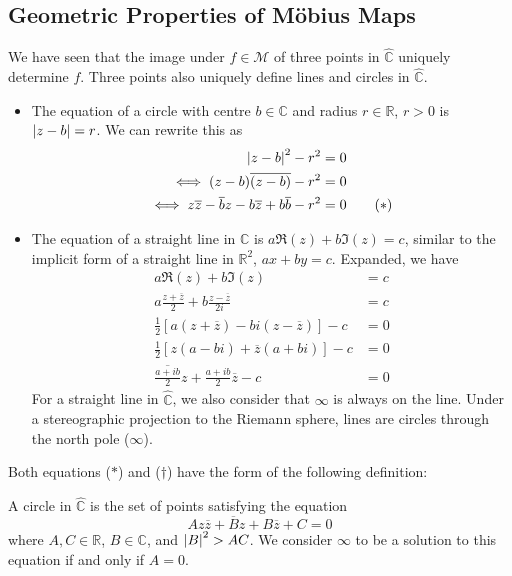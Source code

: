 \subsection{Geometric Properties of M\"obius Maps}
We have seen that the image under \(f \in \mathcal M\) of three points in \(\hat{\mathbb C}\) uniquely determine \(f\).
Three points also uniquely define lines and circles in \(\hat{\mathbb C}\).
\begin{itemize}
	\item The equation of a circle with centre \(b \in \mathbb C\) and radius \(r \in \mathbb R\), \(r > 0\) is \(\abs{z-b} = r\).
	      We can rewrite this as
	      \begin{align*}
		      \abs{z-b}^2 - r^2                                                        & = 0                \\
		      \iff (z-b)\overline{(z-b)} - r^2                                         & = 0                \\
		      \iff z\overline{z} - \overline{b}z - b\overline{z} + b\overline{b} - r^2 & = 0 \tag{\(\ast\)}
	      \end{align*}
	\item The equation of a straight line in \(\mathbb C\) is \(a \Re(z) + b \Im(z) = c\), similar to the implicit form of a straight line in \(\mathbb R^2\), \(ax+by=c\).
	      Expanded, we have
	      \begin{align*}
		      a \Re(z) + b \Im(z)                                                      & = c                   \\
		      a \frac{z + \overline z}{2} + b \frac{z - \overline z}{2i}               & = c                   \\
		      \frac{1}{2}\left[ a (z + \overline z) - bi (z - \overline z) \right] - c & = 0                   \\
		      \frac{1}{2}\left[ z(a-bi) + \overline z(a+bi) \right] - c                & = 0                   \\
		      \overline{\frac{a + ib}{2}}z + \frac{a+ib}{2}\overline{z} - c            & = 0 \tag{\(\dagger\)}
	      \end{align*}
	      For a straight line in \(\hat{\mathbb C}\), we also consider that \(\infty\) is always on the line.
	      Under a stereographic projection to the Riemann sphere, lines are circles through the north pole (\(\infty\)).
\end{itemize}
Both equations (\(\ast\)) and (\(\dagger\)) have the form of the following definition:
\begin{definition}
	A circle in \(\hat{\mathbb C}\) is the set of points satisfying the equation
	\[
		Az\overline z + \overline B z + B \overline z + C = 0
	\]
	where \(A, C \in \mathbb R\), \(B \in \mathbb C\), and \(\abs{B}^2 > AC\).
	We consider \(\infty\) to be a solution to this equation if and only if \(A = 0\).
\end{definition}
